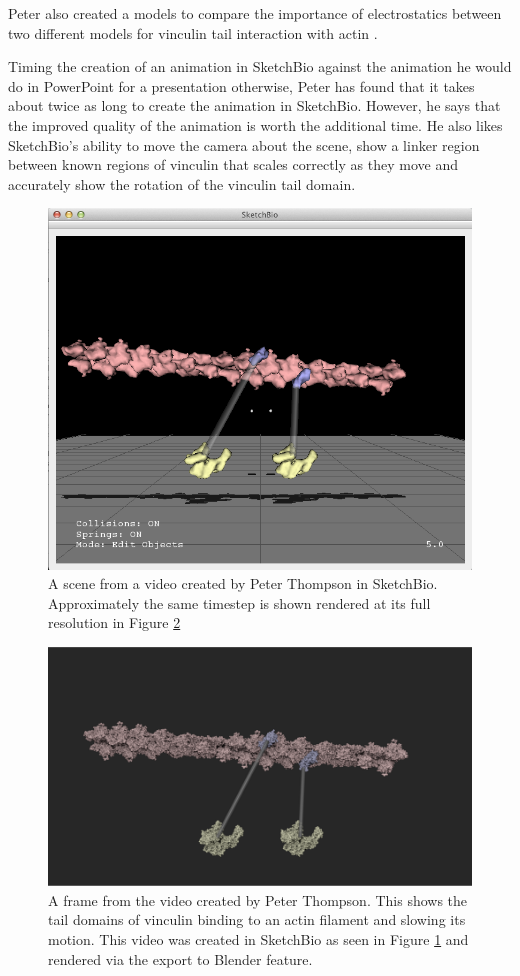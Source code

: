 \documentclass[twocolumn]{bmcart}%
\begin{document}
Peter also created a models to compare the importance of electrostatics between two different models for vinculin tail interaction with actin \cite{janssen2006three}\cite{thompson2014identification}.

Timing the creation of an animation in SketchBio against the animation he would do in PowerPoint for a presentation otherwise, Peter has found that it takes about twice as long to create the animation in SketchBio.
However, he says that the improved quality of the animation is worth the additional time.
He also likes SketchBio's ability to move the camera about the scene, show a linker region between known regions of vinculin that scales correctly as they move and accurately show the rotation of the vinculin tail domain.

\begin{figure}[h]
\centering
\includegraphics[width=0.9\columnwidth]{peter_model.png}
\caption{A scene from a video created by Peter Thompson in SketchBio.
Approximately the same timestep is shown rendered at its full resolution in Figure \ref{fig:peter_video}}
\label{fig:peter_model}
\end{figure}

\begin{figure}[h!]
\centering
\includegraphics[width=0.9\columnwidth]{peter_video.png}
\caption{A frame from the video created by Peter Thompson.  This shows the tail domains of vinculin binding to an actin filament and slowing its motion.
This video was created in SketchBio as seen in Figure \ref{fig:peter_model} and rendered via the export to Blender feature.}
\label{fig:peter_video}
\end{figure}
\end{document}
